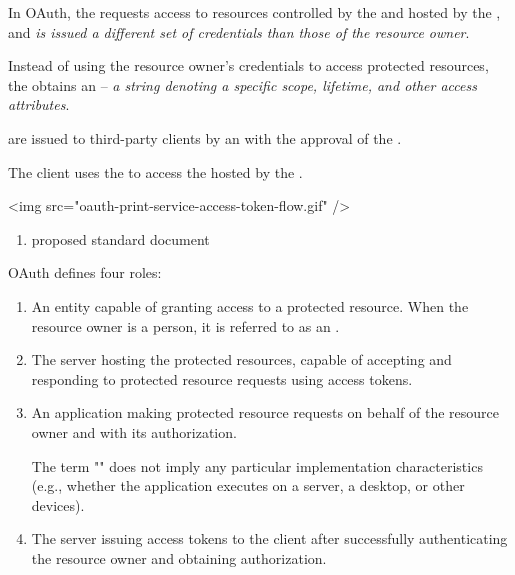 In OAuth, the  requests access to resources controlled
by the  and hosted by the , 
and {\it is
issued a different set of credentials than those of the resource
owner}.

Instead of using the resource owner's credentials to access protected
resources, the  obtains an  
-- {\it a string denoting a
specific scope, lifetime, and other access attributes}.  

are issued to third-party clients by an  with the
approval of the .  

The client uses the  to
access the  hosted by the .

\begin{rawhtml}
<img src="oauth-print-service-access-token-flow.gif" />
\end{rawhtml}

\begin{enumerate}
\item
{} proposed standard document
\end{enumerate}


   OAuth defines four roles:

\begin{enumerate}
\item {}

      An entity capable of granting access to a protected resource.
      When the resource owner is a person, it is referred to as an
      .

\item {}

      The server hosting the protected resources, capable of accepting
      and responding to protected resource requests using access tokens.

\item {}

      An application making protected resource requests on behalf of the
      resource owner and with its authorization.  

The term "" does
      not imply any particular implementation characteristics (e.g.,
      whether the application executes on a server, a desktop, or other
      devices).

\item {}

      The server issuing access tokens to the client after successfully
      authenticating the resource owner and obtaining authorization.
\end{enumerate}

